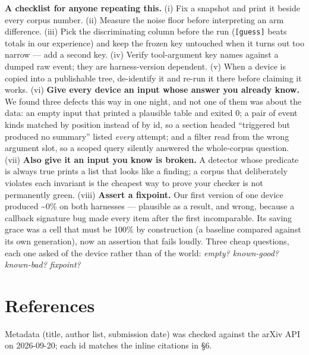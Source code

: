 \documentclass[
]{article}
\begin{document}
\textbf{A checklist for anyone repeating this.} (i) Fix a snapshot and
print it beside every corpus number. (ii) Measure the noise floor before
interpreting an arm difference. (iii) Pick the discriminating column
before the run (\texttt{{[}guess{]}} beats totals in our experience) and
keep the frozen key untouched when it turns out too narrow --- add a
second key. (iv) Verify tool-argument key names against a dumped raw
event; they are harness-version dependent. (v) When a device is copied
into a publishable tree, de-identify it and re-run it there before
claiming it works. (vi) \textbf{Give every device an input whose answer
you already know.} We found three defects this way in one night, and not
one of them was about the data: an empty input that printed a plausible
table and exited 0; a pair of event kinds matched by position instead of
by id, so a section headed ``triggered but produced no summary'' listed
\emph{every} attempt; and a filter read from the wrong argument slot, so
a scoped query silently answered the whole-corpus question. (vii)
\textbf{Also give it an input you know is broken.} A detector whose
predicate is always true prints a list that looks like a finding; a
corpus that deliberately violates each invariant is the cheapest way to
prove your checker is not permanently green. (viii) \textbf{Assert a
fixpoint.} Our first version of one device produced \textasciitilde0\%
on both harnesses --- plausible as a result, and wrong, because a
callback signature bug made every item after the first incomparable. Its
saving grace was a cell that must be 100\% by construction (a baseline
compared against its own generation), now an assertion that fails
loudly. Three cheap questions, each one asked of the device rather than
of the world: \emph{empty? known-good? known-bad? fixpoint?}

\section{References}\label{references}

Metadata (title, author list, submission date) was checked against the
arXiv API on 2026-09-20; each id matches the inline citations in §6.
\end{document}

